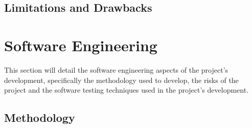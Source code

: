 \documentclass[12pt]{article}
\begin{document}
    \subsection{Limitations and Drawbacks}\label{subsec:limitations-and-drawbacks}




    \pagebreak


    \section{Software Engineering}\label{sec:software-engineering}

    \tab
    This section will detail the software engineering aspects of the project's development, specifically the
    methodology used to develop, the risks of the project and the software testing techniques used in the project's
    development.


    \subsection{Methodology}\label{subsec:methodology}

\end{document}
